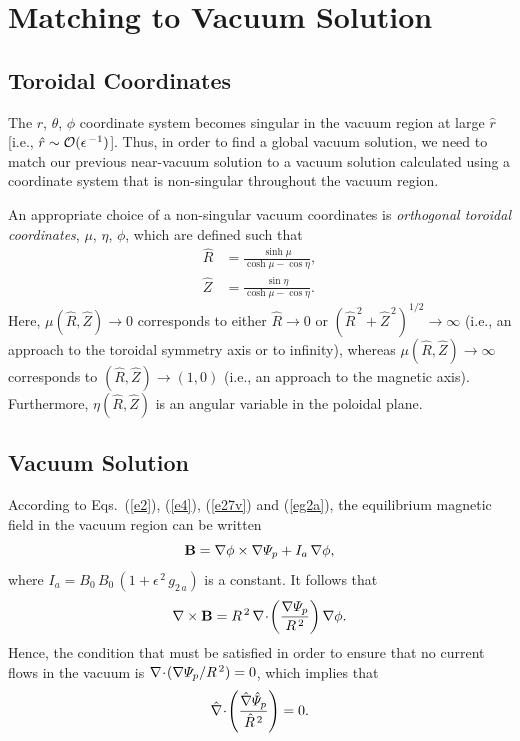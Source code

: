 \documentclass[12pt,prb,aps]{revtex4-1}
\begin{document}
\section{Matching to Vacuum Solution}\label{svac}
\subsection{Toroidal Coordinates}
The $r$, $\theta$, $\phi$ coordinate system  becomes singular in the vacuum region at large $\hat{r}$ [i.e., $\hat{r}\sim {\cal O}(\epsilon^{\,-1})$]. Thus, in order to
find a global vacuum solution, we need to match our previous near-vacuum solution to a vacuum solution calculated using a
coordinate system that is non-singular throughout the vacuum region. 

An appropriate choice of a non-singular vacuum coordinates
is {\em orthogonal toroidal coordinates},\cite{fitz93,greene} $\mu$, $\eta$, $\phi$,  which are defined such that\,\cite{morse}
\begin{align}\label{e54}
\hat{R} &= \frac{\sinh\mu}{\cosh\mu-\cos\eta},\\[0.5ex]
\hat{Z}&= \frac{\sin\eta}{\cosh\mu-\cos\eta}.\label{e55}
\end{align}
Here, $\mu(\hat{R},\hat{Z})\rightarrow 0$ corresponds to either $\hat{R}\rightarrow 0$ or $(\hat{R}^{\,2}+\hat{Z}^{\,2})^{1/2}\rightarrow\infty$ (i.e.,
an approach to the toroidal symmetry axis or to infinity), whereas $\mu(\hat{R},\hat{Z})\rightarrow \infty$
corresponds to $(\hat{R}, \hat{Z}) \rightarrow (1, 0)$ (i.e., an approach to the magnetic axis). Furthermore, $\eta(\hat{R},\hat{Z})$ is an angular variable in the poloidal
plane.  

\subsection{Vacuum Solution}
According to Eqs.~(\ref{e2}), (\ref{e4}), (\ref{e27v}) and (\ref{eg2a}), the equilibrium magnetic field in the vacuum region can be
written
\begin{equation}
{\bf B} = \nabla\phi\times \nabla{\mit\Psi}_p+ I_a\,\nabla\phi,
\end{equation}
where $I_a=B_0\,B_0\,(1+\epsilon^{\,2}\,g_{2\,a})$ is a constant. It follows that
\begin{equation}\label{e67}
\nabla\times {\bf B} = R^{\,2}\,\nabla\!\cdot\!\left(\frac{\nabla{\mit\Psi}_p}{R^{\,2}}\right)\nabla\phi.
\end{equation}
Hence, the condition that must be satisfied in order to ensure that no current flows in the vacuum is
$\nabla\!\cdot\!(\nabla{\mit\Psi}_p/R^{\,2})=0$,
which implies that
\begin{equation}
\hat{\nabla}\!\cdot\!\left(\frac{\hat{\nabla}\hat{{\mit\Psi}}_p}{\hat{R}^{\,2}}\right)=0.
\end{equation}
\end{document}
